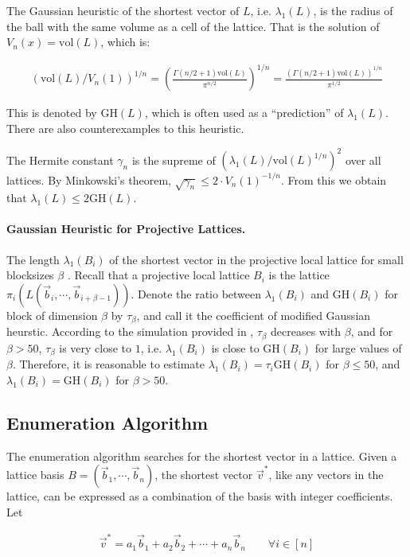 \documentclass[11pt]{article}
\newcommand{\vb}{\vec{b}}
\newcommand{\vvs}{\vec{v}^*}
\newcommand{\vol}{\mathrm{vol}}
\newcommand{\GH}{\mathrm{GH}}
\begin{document}
The Gaussian heuristic of the shortest vector of $L$, i.e. $\lambda_1(L)$, is the radius of the ball with the same volume as a cell of the lattice.
That is the solution of $V_n(x)=\vol(L)$, which is:

\begin{eqnarray}
(\vol(L)/V_n(1))^{1/n} = \left(\frac{\Gamma(n/2+1)\vol(L)}{\pi^{n/2}}\right)^{1/n}=\frac{(\Gamma(n/2+1)\vol(L))^{1/n}}{\pi^{1/2}}
\end{eqnarray}

This is denoted by $\GH(L)$, which is often used as a ``prediction'' of $\lambda_1(L)$.
There are also counterexamples to this heuristic.

The Hermite constant $\gamma_n$ is the supreme of $(\lambda_1(L)/\vol(L)^{1/n})^2$ over all lattices.
By Minkowski's theorem, $\sqrt{\gamma_n}\leq 2\cdot V_n(1)^{-1/n}$.
From this we obtain that $\lambda_1(L)\leq 2\GH(L)$.

\paragraph{Gaussian Heuristic for Projective Lattices.} The length $\lambda_1(B_i)$ of the shortest vector in the projective local lattice for small blocksizes $\beta$ \cite{cn2011bkz}.
Recall that a projective local lattice $B_i$ is the lattice $\pi_i(L(\vb_i,\cdots,\vb_{i+\beta-1}))$.
Denote the ratio between $\lambda_1(B_i)$ and $\GH(B_i)$ for block of dimension $\beta$ by $\tau_{\beta}$, and call it the coefficient of modified Gaussian heurstic.
According to the simulation provided in \cite{cn2011bkz}, $\tau_{\beta}$ decreases with $\beta$, and for $\beta>50$, $\tau_{\beta}$ is very close to $1$, i.e. $\lambda_1(B_i)$ is close to $\GH(B_i)$ for large values of $\beta$.
Therefore, it is reasonable to estimate $\lambda_1(B_i)=\tau_i\GH(B_i)$ for $\beta\leq 50$, and $\lambda_1(B_i)=\GH(B_i)$ for $\beta>50$.

\subsection{Enumeration Algorithm}

The enumeration algorithm \cite{gnr2010lattice} searches for the shortest vector in a lattice.
Given a lattice basis $B=(\vb_1,\cdots,\vb_n)$, the shortest vector $\vvs$, like any vectors in the lattice, can be expressed as a combination of the basis with integer coefficients.
Let

\begin{eqnarray}
\vvs=a_1\vb_1+a_2\vb_2+\cdots+a_n\vb_n\qquad\forall i\in[n]
\end{eqnarray}
\end{document}

